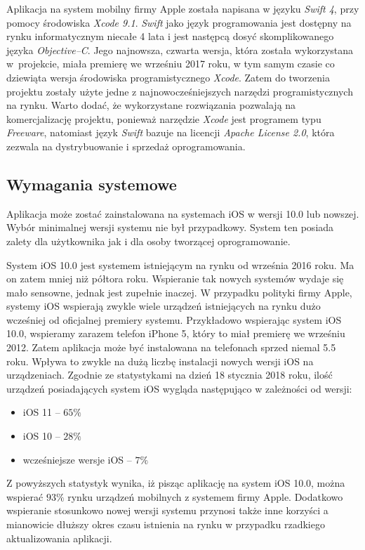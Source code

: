 \documentclass[twoside]{projektInzynierskiMS}
\begin{document}
Aplikacja na system mobilny firmy Apple została napisana w języku \textit{Swift 4}, przy pomocy środowiska \textit{Xcode 9.1}. \textit{Swift} jako język programowania jest dostępny na rynku informatycznym niecałe 4 lata i jest następcą dosyć skomplikowanego języka \textit{Objective--C}. Jego najnowsza, czwarta wersja, która została wykorzystana w~projekcie, miała premierę we wrześniu 2017 roku, w tym samym czasie co dziewiąta wersja środowiska programistycznego \textit{Xcode}. Zatem do tworzenia projektu zostały użyte jedne z najnowocześniejszych narzędzi programistycznych na rynku. Warto dodać, że wykorzystane rozwiązania pozwalają na komercjalizację projektu, ponieważ narzędzie \textit{Xcode} jest programem typu \textit{Freeware}, natomiast język \textit{Swift} bazuje na licencji \textit{Apache License 2.0}, która zezwala na dystrybuowanie i sprzedaż oprogramowania.

\subsection{Wymagania systemowe}

Aplikacja może zostać zainstalowana na systemach iOS w wersji 10.0 lub nowszej. Wybór minimalnej wersji systemu nie był przypadkowy. System ten posiada zalety dla użytkownika jak i dla osoby tworzącej oprogramowanie.

System iOS 10.0 jest systemem istniejącym na rynku od września 2016 roku. Ma on zatem mniej niż półtora roku. Wspieranie tak nowych systemów wydaje się mało sensowne, jednak jest zupełnie inaczej. W przypadku polityki firmy Apple, systemy iOS wspierają zwykle wiele urządzeń istniejących na rynku dużo wcześniej od oficjalnej premiery systemu. Przykładowo wspierając system iOS 10.0, wspieramy zarazem telefon iPhone 5, który to miał premierę we wrześniu 2012. Zatem aplikacja może być instalowana na telefonach sprzed niemal 5.5 roku. Wpływa to zwykle na dużą liczbę instalacji nowych wersji iOS na urządzeniach. Zgodnie ze statystykami \cite{iosStatistics} na dzień 18 stycznia 2018 roku, ilość urządzeń posiadających system iOS wygląda następująco w zależności od wersji:
\begin{itemize}
\item iOS 11 -- $65\%$
\item iOS 10 -- $28\%$
\item wcześniejsze wersje iOS -- $7\%$
\end{itemize}

Z powyższych statystyk wynika, iż pisząc aplikację na system iOS 10.0, można wspierać $93\%$ rynku urządzeń mobilnych z systemem firmy Apple. Dodatkowo wspieranie stosunkowo nowej wersji systemu przynosi także inne korzyści a mianowicie dłuższy okres czasu istnienia na rynku w przypadku rzadkiego aktualizowania aplikacji.
\end{document}
